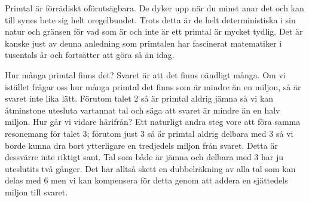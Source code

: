 
Primtal är förrädiskt oförutsägbara.
De dyker upp när du minst anar det och kan till synes bete sig helt oregelbundet.
Trots detta är de helt deterministiska i sin natur och gränsen för vad som är och inte är ett primtal är mycket tydlig.
Det är kanske just av denna anledning som primtalen har fascinerat matematiker i tusentals år och fortsätter att göra så än idag.

Hur många primtal finns det? Svaret är att det finns oändligt många.
Om vi istället frågar oss hur många primtal det finns som är mindre än en miljon, så är svaret inte lika lätt.
Förutom talet 2 så är primtal aldrig jämna så vi kan åtminstone utesluta vartannat tal och säga att svaret är mindre än en halv miljon.
Hur går vi vidare härifrån?
Ett naturligt andra steg vore att föra samma resonemang för talet 3;
förutom just 3 så är primtal aldrig delbara med 3 så vi borde kunna dra bort ytterligare en tredjedels miljon från svaret.
Detta är dessvärre inte riktigt sant.
Tal som både är jämna och delbara med 3 har ju uteslutits två gånger.
Det har alltså skett en dubbelräkning av alla tal som kan delas med 6 men vi kan kompensera för detta genom att addera en sjättedels miljon till svaret.


